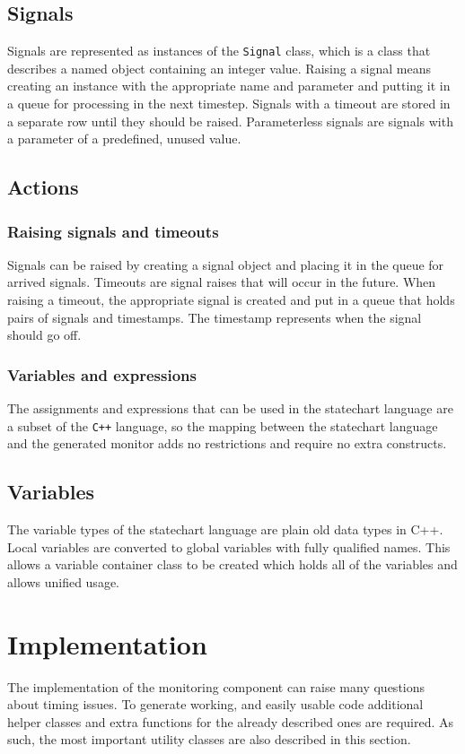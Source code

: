   \subsection{Signals}
Signals are represented as instances of the \verb!Signal! class, which is a class that describes a named object containing an integer value. Raising a signal means creating an instance with the appropriate name and parameter and putting it in a queue for processing in the next timestep. Signals with a timeout are stored in a separate row until they should be raised. Parameterless signals are signals with a parameter of a predefined, unused value.
  \subsection{Actions}
    \subsubsection{Raising signals and timeouts}
Signals can be raised by creating a signal object and placing it in the queue for arrived signals. Timeouts are signal raises that will occur in the future. When raising a timeout, the appropriate signal is created and put in a queue that holds pairs of signals and timestamps. The timestamp represents when the signal should go off.
    \subsubsection{Variables and expressions}
The assignments and expressions that can be used in the statechart language are a subset of the \verb!C++! language, so the mapping between the statechart language and the generated monitor adds no restrictions and require no extra constructs.
  \subsection{Variables}
The variable types of the statechart language are plain old data types in C++. Local variables are converted to global variables with fully qualified names. This allows a variable container class to be created which holds all of the variables and allows unified usage.
\section{Implementation}
The implementation of the monitoring component can raise many questions about timing issues. To generate working, and easily usable code additional helper classes and extra functions for the already described ones are required. As such, the most important utility classes are also described in this section.
